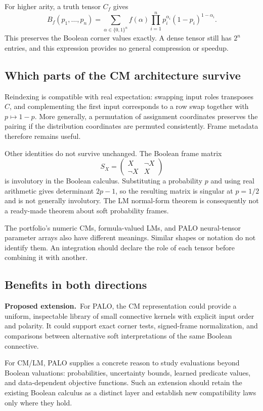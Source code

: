 \documentclass[11pt,a4paper]{article}
\theoremstyle{remark}
\newcommand{\B}{\{0,1\}}
\newcommand{\proposal}{\textbf{Proposed extension.}\ }
\begin{document}
For higher arity, a truth tensor $C_f$ gives
\begin{equation}
 B_f(p_1,\ldots,p_n)=\sum_{\alpha\in\B^n} f(\alpha)
 \prod_{i=1}^n p_i^{\alpha_i}(1-p_i)^{1-\alpha_i}.
 \label{eq:multilinear}
\end{equation}
This preserves the Boolean corner values exactly. A dense tensor still has $2^n$ entries, and this expression provides no general compression or speedup.

\subsection{Which parts of the CM architecture survive}
Reindexing is compatible with real expectation: swapping input roles transposes $C$, and complementing the first input corresponds to a row swap together with $p\mapsto1-p$. More generally, a permutation of assignment coordinates preserves the pairing if the distribution coordinates are permuted consistently. Frame metadata therefore remains useful.

Other identities do not survive unchanged. The Boolean frame matrix
\[
S_X=\begin{pmatrix}X&\neg X\\\neg X&X\end{pmatrix}
\]
is involutory in the Boolean calculus. Substituting a probability $p$ and using real arithmetic gives determinant $2p-1$, so the resulting matrix is singular at $p=1/2$ and is not generally involutory. The LM normal-form theorem is consequently not a ready-made theorem about soft probability frames.

The portfolio's numeric CMs, formula-valued LMs, and PALO neural-tensor parameter arrays also have different meanings. Similar shapes or notation do not identify them. An integration should declare the role of each tensor before combining it with another.

\subsection{Benefits in both directions}
\proposal For PALO, the CM representation could provide a uniform, inspectable library of small connective kernels with explicit input order and polarity. It could support exact corner tests, signed-frame normalization, and comparisons between alternative soft interpretations of the same Boolean connective.

For CM/LM, PALO supplies a concrete reason to study evaluations beyond Boolean valuations: probabilities, uncertainty bounds, learned predicate values, and data-dependent objective functions. Such an extension should retain the existing Boolean calculus as a distinct layer and establish new compatibility laws only where they hold.
\end{document}
